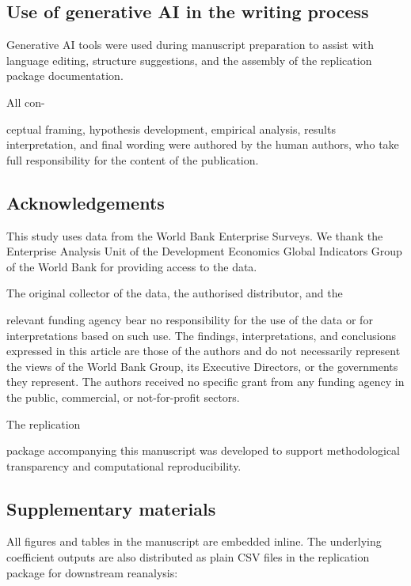 \documentclass[12pt,a4paper]{article}
\begin{document}
\hypertarget{use-of-generative-ai-in-the-writing-process}{%
\subsection{Use of generative AI in the writing
process}\label{use-of-generative-ai-in-the-writing-process}}

Generative AI tools were used during manuscript preparation to assist
with language editing, structure suggestions, and the assembly of the
replication package documentation.

All con-

ceptual framing, hypothesis development, empirical analysis, results
interpretation, and final wording were authored by the human authors,
who take full responsibility for the content of the publication.

\hypertarget{acknowledgements}{%
\subsection{Acknowledgements}\label{acknowledgements}}

This study uses data from the World Bank Enterprise Surveys. We thank
the Enterprise Analysis Unit of the Development Economics Global
Indicators Group of the World Bank for providing access to the data.

The original collector of the data, the authorised distributor, and the

relevant funding agency bear no responsibility for the use of the data
or for interpretations based on such use. The findings, interpretations,
and conclusions expressed in this article are those of the authors and
do not necessarily represent the views of the World Bank Group, its
Executive Directors, or the governments they represent. The authors
received no specific grant from any funding agency in the public,
commercial, or not-for-profit sectors.

The replication

package accompanying this manuscript was developed to support
methodological transparency and computational reproducibility.

\hypertarget{supplementary-materials}{%
\subsection{Supplementary materials}\label{supplementary-materials}}

All figures and tables in the manuscript are embedded inline. The
underlying coefficient outputs are also distributed as plain CSV files
in the replication package for downstream reanalysis:
\end{document}
